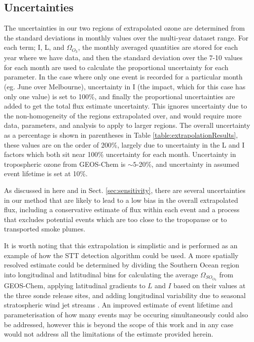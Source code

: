 \documentclass[acp, manuscript]{copernicus} %
\begin{document}
  \subsection{Uncertainties}
    The uncertainties in our two regions of extrapolated ozone are determined from the standard deviations in monthly values over the multi-year dataset range.
    For each term; I, L, and $\Omega_{O_3}$, the monthly averaged quantities are stored for each year where we have data, and then the standard deviation over the 7-10 values for each month are used to calculate the proportional uncertainty for each parameter.
    In the case where only one event is recorded for a particular month (eg. June over Melbourne), uncertainty in I (the impact, which for this case has only one value) is set to 100\%, and finally the proportional uncertainties are added to get the total flux estimate uncertainty.
    This ignores uncertainty due to the non-homogeneity of the regions extrapolated over, and would require more data, parameters, and analysis to apply to larger regions.
    The overall uncertainty as a percentage is shown in parentheses in Table \ref{table:extrapolationResults}, these values are on the order of 200\%, largely due to uncertainty in the L and I factors which both sit near 100\% uncertainty for each month.
    Uncertainty in tropospheric ozone from GEOS-Chem is $\sim 5$-20\%, and uncertainty in assumed event lifetime is set at 10\%.
    
    As discussed in here and in Sect. \ref{sec:sensitivity}, there are several uncertainties in our method that are likely to lead to a low bias in the overall extrapolated flux, including a conservative estimate of flux within each event and a process that excludes potential events which are too close to the tropopause or to transported smoke plumes.
    
    It is worth noting that this extrapolation is simplistic and is performed as an example of how the STT detection algorithm could be used.
    A more spatially resolved estimate could be determined by dividing the Southern Ocean region into longitudinal and latitudinal bins for calculating the average $\Omega_{SO_{O_3}}$ from GEOS-Chem, applying latitudinal gradients to $L$ and $I$ based on their values at the three sonde release sites, and adding longitudinal variability due to seasonal stratospheric wind jet streams \citep{Baray2012,Skerlak2015}.
    An improved estimate of event lifetime and parameterisation of how many events may be occuring simultaneously could also be addressed, however this is beyond the scope of this work and in any case would not address all the limitations of the estimate provided herein.
\end{document}
